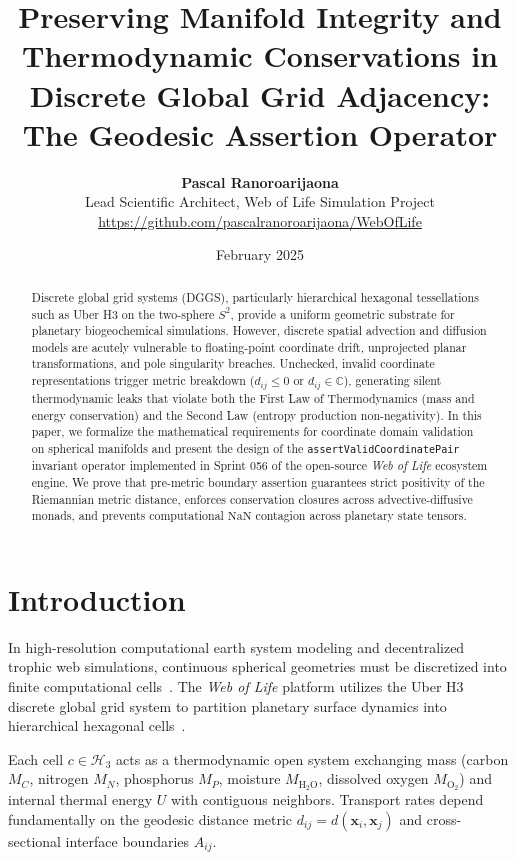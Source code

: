 \documentclass[11pt, a4paper]{article}
\title{Preserving Manifold Integrity and Thermodynamic Conservations in Discrete Global Grid Adjacency: The Geodesic Assertion Operator}
\author{
    \textbf{Pascal Ranoroarijaona} \\
    Lead Scientific Architect, Web of Life Simulation Project \\
    \url{https://github.com/pascalranoroarijaona/WebOfLife}
}
\date{February 2025}
\begin{document}
\maketitle

\begin{abstract}
Discrete global grid systems (DGGS), particularly hierarchical hexagonal tessellations such as Uber H3 on the two-sphere $S^2$, provide a uniform geometric substrate for planetary biogeochemical simulations. However, discrete spatial advection and diffusion models are acutely vulnerable to floating-point coordinate drift, unprojected planar transformations, and pole singularity breaches. Unchecked, invalid coordinate representations trigger metric breakdown ($d_{ij} \le 0$ or $d_{ij} \in \mathbb{C}$), generating silent thermodynamic leaks that violate both the First Law of Thermodynamics (mass and energy conservation) and the Second Law (entropy production non-negativity). In this paper, we formalize the mathematical requirements for coordinate domain validation on spherical manifolds and present the design of the \texttt{assertValidCoordinatePair} invariant operator implemented in Sprint 056 of the open-source \textit{Web of Life} ecosystem engine. We prove that pre-metric boundary assertion guarantees strict positivity of the Riemannian metric distance, enforces conservation closures across advective-diffusive monads, and prevents computational $\text{NaN}$ contagion across planetary state tensors.
\end{abstract}

\section{Introduction}

In high-resolution computational earth system modeling and decentralized trophic web simulations, continuous spherical geometries must be discretized into finite computational cells~\cite{sahr2003geodesic}. The \textit{Web of Life} platform utilizes the Uber H3 discrete global grid system to partition planetary surface dynamics into hierarchical hexagonal cells~\cite{weboflife2025}. 

Each cell $c \in \mathcal{H}_3$ acts as a thermodynamic open system exchanging mass (carbon $M_C$, nitrogen $M_N$, phosphorus $M_P$, moisture $M_{\text{H}_2\text{O}}$, dissolved oxygen $M_{\text{O}_2}$) and internal thermal energy $U$ with contiguous neighbors. Transport rates depend fundamentally on the geodesic distance metric $d_{ij} = d(\mathbf{x}_i, \mathbf{x}_j)$ and cross-sectional interface boundaries $A_{ij}$. 
\end{document}

